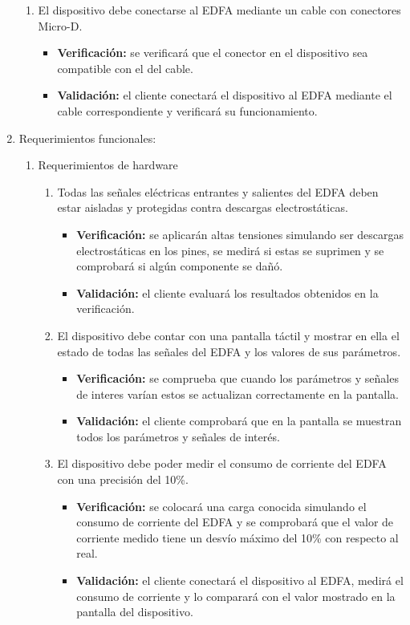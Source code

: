 \documentclass[
11pt, %
]{charter}
\begin{document}
\begin{enumerate}
\begin{enumerate}
\item El dispositivo debe conectarse al EDFA mediante un cable con conectores Micro-D.
\begin{itemize}
	\item \textbf{Verificación:} se verificará que el conector en el dispositivo sea compatible con el del cable.
	\item \textbf{Validación:} el cliente conectará el dispositivo al EDFA mediante el cable correspondiente y verificará su funcionamiento.
\end{itemize}
\end{enumerate}

\item Requerimientos funcionales:
\begin{enumerate}
\item Requerimientos de hardware
\begin{enumerate}[label*=\arabic*.]
\item Todas las señales eléctricas entrantes y salientes del EDFA deben estar aisladas y protegidas contra descargas electrostáticas.
\begin{itemize}
	\item \textbf{Verificación:} se aplicarán altas tensiones simulando ser descargas electrostáticas en los pines, se medirá si estas se suprimen y se comprobará si algún componente se dañó.
	\item \textbf{Validación:} el cliente evaluará los resultados obtenidos en la verificación.
\end{itemize}

\item El dispositivo debe contar con una pantalla táctil y mostrar en ella el estado de todas las señales del EDFA y los valores de sus parámetros.
\begin{itemize}
	\item \textbf{Verificación:} se comprueba que cuando los parámetros y señales de interes varían estos se actualizan correctamente en la pantalla.
	\item \textbf{Validación:} el cliente comprobará que en la pantalla se muestran todos los parámetros y señales de interés.
\end{itemize}

\item El dispositivo debe poder medir el consumo de corriente del EDFA con una precisión del 10\%.
\begin{itemize}
	\item \textbf{Verificación:} se colocará una carga conocida simulando el consumo de corriente del EDFA y se comprobará que el valor de corriente medido tiene un desvío máximo del 10\% con respecto al real.
	\item \textbf{Validación:} el cliente conectará el dispositivo al EDFA, medirá el consumo de corriente y lo comparará con el valor mostrado en la pantalla del dispositivo.
\end{itemize}


\end{enumerate}
\end{enumerate}
\end{enumerate}
\end{document}
